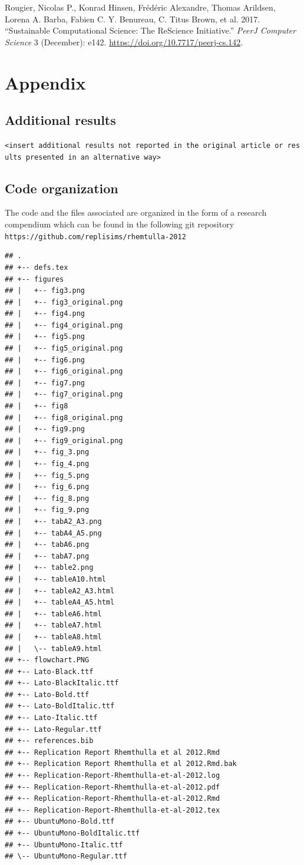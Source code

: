 \documentclass[10,a4paperpaper,]{article}
\newenvironment{CSLReferences}%
  {}%
  {\par}
\begin{document}
\hypertarget{refs}{}
\begin{CSLReferences}{1}{0}
\leavevmode{}%
Rougier, Nicolas P., Konrad Hinsen, Frédéric Alexandre, Thomas Arildsen,
Lorena A. Barba, Fabien C. Y. Benureau, C. Titus Brown, et al. 2017.
{``Sustainable Computational Science: The {ReScience} Initiative.''}
\emph{PeerJ Computer Science} 3 (December): e142.
\url{https://doi.org/10.7717/peerj-cs.142}.

\end{CSLReferences}

\FloatBarrier
\endgroup
\newpage

\section*{Appendix}

\subsection*{Additional results}

\texttt{\textless{}insert\ additional\ results\ not\ reported\ in\ the\ original\ article\ or\ results\ presented\ in\ an\ alternative\ way\textgreater{}}

\subsection{Code organization}

The code and the files associated are organized in the form of a
research compendium which can be found in the following git repository
\texttt{https://github.com/replisims/rhemtulla-2012}

\begin{verbatim}
## .
## +-- defs.tex
## +-- figures
## |   +-- fig3.png
## |   +-- fig3_original.png
## |   +-- fig4.png
## |   +-- fig4_original.png
## |   +-- fig5.png
## |   +-- fig5_original.png
## |   +-- fig6.png
## |   +-- fig6_original.png
## |   +-- fig7.png
## |   +-- fig7_original.png
## |   +-- fig8
## |   +-- fig8_original.png
## |   +-- fig9.png
## |   +-- fig9_original.png
## |   +-- fig_3.png
## |   +-- fig_4.png
## |   +-- fig_5.png
## |   +-- fig_6.png
## |   +-- fig_8.png
## |   +-- fig_9.png
## |   +-- tabA2_A3.png
## |   +-- tabA4_A5.png
## |   +-- tabA6.png
## |   +-- tabA7.png
## |   +-- table2.png
## |   +-- tableA10.html
## |   +-- tableA2_A3.html
## |   +-- tableA4_A5.html
## |   +-- tableA6.html
## |   +-- tableA7.html
## |   +-- tableA8.html
## |   \-- tableA9.html
## +-- flowchart.PNG
## +-- Lato-Black.ttf
## +-- Lato-BlackItalic.ttf
## +-- Lato-Bold.ttf
## +-- Lato-BoldItalic.ttf
## +-- Lato-Italic.ttf
## +-- Lato-Regular.ttf
## +-- references.bib
## +-- Replication Report Rhemthulla et al 2012.Rmd
## +-- Replication Report Rhemthulla et al 2012.Rmd.bak
## +-- Replication-Report-Rhemthulla-et-al-2012.log
## +-- Replication-Report-Rhemthulla-et-al-2012.pdf
## +-- Replication-Report-Rhemthulla-et-al-2012.Rmd
## +-- Replication-Report-Rhemthulla-et-al-2012.tex
## +-- UbuntuMono-Bold.ttf
## +-- UbuntuMono-BoldItalic.ttf
## +-- UbuntuMono-Italic.ttf
## \-- UbuntuMono-Regular.ttf
\end{verbatim}
\end{document}
